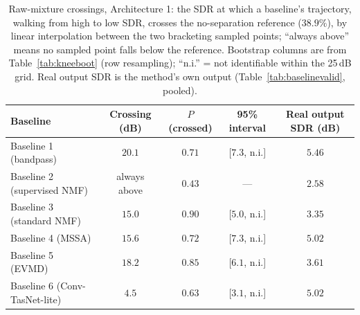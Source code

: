 \documentclass[11pt]{article}
\begin{document}
\begin{table}[H]
\centering
\caption{Raw-mixture crossings, Architecture 1: the SDR at which a baseline's trajectory, walking from high to low SDR, crosses the no-separation reference ($38.9\%$), by linear interpolation between the two bracketing sampled points; ``always above'' means no sampled point falls below the reference. Bootstrap columns are from Table~\ref{tab:kneeboot} (row resampling); ``n.i.'' = not identifiable within the 25\,dB grid. Real output SDR is the method's own output (Table~\ref{tab:baselinevalid}, pooled).}
\label{tab:knee}
\begin{tabular}{@{}lcccc@{}}
\toprule
Baseline & Crossing (dB) & $P$(crossed) & 95\% interval & Real output SDR (dB) \\
\midrule
Baseline 1 (bandpass)         & $20.1$ & $0.71$ & [$7.3$, n.i.] & $5.46$ \\
Baseline 2 (supervised NMF)   & always above & $0.43$ & --- & $2.58$ \\
Baseline 3 (standard NMF)     & $15.0$ & $0.90$ & [$5.0$, n.i.] & $3.35$ \\
Baseline 4 (MSSA)             & $15.6$ & $0.72$ & [$7.3$, n.i.] & $5.02$ \\
Baseline 5 (EVMD)             & $18.2$ & $0.85$ & [$6.1$, n.i.] & $3.61$ \\
Baseline 6 (Conv-TasNet-lite) & $4.5$  & $0.63$ & [$3.1$, n.i.] & $5.02$ \\
\bottomrule
\end{tabular}
\end{table}
\end{document}
